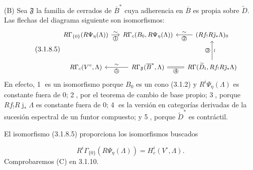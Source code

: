 \medskip
\noindent\textup{(B)}
Sea $\mathfrak F$ la familia de cerrados de $\overline B^*$ cuya
adherencia en $\overline B$ es propia sobre $\widetilde D$. Las flechas
del diagrama siguiente son isomorfismos:
\begin{equation}\tag{3.1.8.5}
\begin{tikzcd}[column sep=small,row sep=large,cells={nodes={font=\small}}]
R\Gamma_{\{0\}}(R\Psi_\eta(\Lambda))
  \arrow[r,"\sim","\text{\textcircled{1}}"']
  & R\Gamma_c(B_0,R\Psi_\eta(\Lambda))
  & (Rf_!R\bar\jmath_*\Lambda)_0
      \arrow[l,"\sim"',"\text{\textcircled{2}}"] \\
R\Gamma_c(V^\circ,\Lambda)
  & R\Gamma_{\mathfrak F}(\overline B^*,\Lambda)
      \arrow[l,"\sim"',"\text{\textcircled{5}}"]
      \arrow[r,equal,"\text{\textcircled{4}}"']
  & R\Gamma(\widetilde D_t,Rf_!R\bar\jmath_*\Lambda)
      \arrow[u,"\text{\textcircled{3}}","\wr"']
\end{tikzcd}
\end{equation}
En efecto, \textcircled{1} es un isomorfismo porque $B_0$ es un cono
(3.1.2) y $R^i\Psi_\eta(\Lambda)$ es constante fuera de $0$;
\textcircled{2}, por el teorema de cambio de base propio;
\textcircled{3}, porque $Rf_!R\bar\jmath_*\Lambda$ es constante fuera de
$0$; \textcircled{4} es la versión en categorías derivadas de la
sucesión espectral de un funtor compuesto; y \textcircled{5}, porque
$\widetilde D^*$ es contráctil.

El isomorfismo (3.1.8.5) proporciona los isomorfismos buscados

\pageoriginale

\begin{equation}\tag{3.1.8.6}
R^i\Gamma_{\{0\}}(R\Psi_\eta(\Lambda))
= H_c^i(V^\circ,\Lambda).
\end{equation}
Comprobaremos (C) en 3.1.10.

